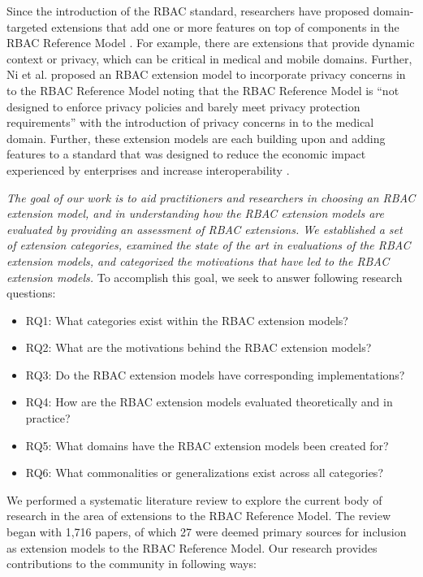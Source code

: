 Since the introduction of the RBAC standard, researchers have proposed domain-targeted extensions that add one or more features on top of components in the RBAC Reference Model \cite{kuhn2010adding}.
For example, there are extensions that provide dynamic context or privacy, which can be critical in medical and mobile domains.
Further, Ni et al. \cite{ni2010privacy} proposed an RBAC extension model to incorporate privacy concerns in to the RBAC Reference Model noting that the RBAC Reference Model is ``not designed to enforce privacy policies and barely meet privacy protection requirements'' with the introduction of privacy concerns in to the medical domain.
Further, these extension models are each building upon and adding features to a standard that was designed to reduce the economic impact experienced by enterprises and increase interoperability \cite{o20102010}.

\textit{The goal of our work is to aid practitioners and researchers in choosing an RBAC extension model, and in understanding
how the RBAC extension models are evaluated by providing an assessment of RBAC extensions. We established a set of extension categories, examined the state of the art in evaluations of the RBAC extension models, and categorized the motivations that have led to the RBAC extension models.
} To accomplish this goal, we seek to answer following research questions:

\begin{itemize}
\setlength{\itemsep}{0.25pt}
\item RQ1: What categories exist within the RBAC extension models?
\item RQ2: What are the motivations behind the RBAC extension models?
\item RQ3: Do the RBAC extension models have corresponding implementations?
\item RQ4: How are the RBAC extension models evaluated theoretically and in practice?
\item RQ5: What domains have the RBAC extension models been created for?
\item RQ6: What commonalities or generalizations exist across all categories?
\end{itemize}

We performed a systematic literature review to explore the current body of research in the area of extensions to the RBAC Reference Model. 
The review began with 1,716 papers, of which 27 were deemed primary sources for inclusion as extension models to the RBAC Reference Model.
Our research provides contributions to the community in following ways:

